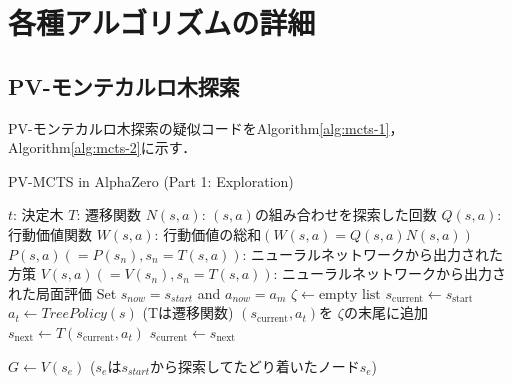 \chapter{各種アルゴリズムの詳細}
\label{chap:alg}
\section{PV-モンテカルロ木探索}
PV-モンテカルロ木探索の疑似コードをAlgorithm\ref{alg:mcts-1}，Algorithm\ref{alg:mcts-2}に示す．
\begin{algorithm}
    \caption{PV-MCTS in AlphaZero (Part 1: Exploration)}
    \label{alg:mcts-1}
    \begin{algorithmic}[1]
        \State $t$: 決定木
        \State $T$: 遷移関数
        \State $N(s, a)$: $(s, a)$の組み合わせを探索した回数
        \State $Q(s, a)$: 行動価値関数 
        \State $W(s, a)$: 行動価値の総和$(W(s, a)=Q(s, a)N(s, a))$
        \State $P(s, a)(=P(s_n), s_n=T(s, a))$: 
        \State ニューラルネットワークから出力された方策
        \State $V(s, a)(=V(s_n), s_n=T(s, a))$: 
        \State ニューラルネットワークから出力された局面評価
            \State Set $s_{now} = s_{start}$ and $a_{now} = a_m$
                \State $\zeta \gets \textrm{empty list}$
                \State $s_{\text{current}} \gets s_{\text{start}}$
                    \State $a_t \gets TreePolicy(s)$
                    \State (Tは遷移関数)
                    \State $(s_{\text{current}}, a_t)$を $\zeta $の末尾に追加
                    \State $s_{\text{next}} \gets T(s_{\text{current}}, a_t)$
                    \State $s_{\text{current}} \gets s_{\text{next}}$
                    
                \EndWhile
                \State $G \gets V(s_e)$ 
                \State($s_e$は$s_{start}$から探索してたどり着いたノード$s_e$)
                \State {}
            \EndFor
        \EndFunction
        
        
    \end{algorithmic}
\end{algorithm}
